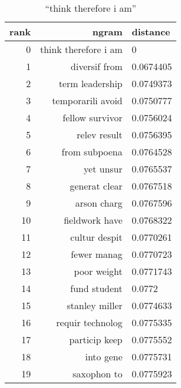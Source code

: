 \begin{table}[ht]
    \begin{subtable}[t]{.45\textwidth}
        \centering
        \begin{tabularx}{\textwidth}{r R l}
            \toprule
            rank & ngram & distance\\
            \midrule
            \num{0} & think therefore i am & \num{0}\\
            \num{1} & diversif from & \num{0.0674405}\\
            \num{2} & term leadership & \num{0.0749373}\\
            \num{3} & temporarili avoid & \num{0.0750777}\\
            \num{4} & fellow survivor & \num{0.0756024}\\
            \midrule
            \num{5} & relev result & \num{0.0756395}\\
            \num{6} & from subpoena & \num{0.0764528}\\
            \num{7} & yet unsur & \num{0.0765537}\\
            \num{8} & generat clear & \num{0.0767518}\\
            \num{9} & arson charg & \num{0.0767596}\\
            \num{10} & fieldwork have & \num{0.0768322}\\
            \num{11} & cultur despit & \num{0.0770261}\\
            \num{12} & fewer manag & \num{0.0770723}\\
            \num{13} & poor weight & \num{0.0771743}\\
            \num{14} & fund student & \num{0.0772}\\
            \num{15} & stanley miller & \num{0.0774633}\\
            \num{16} & requir technolog & \num{0.0775335}\\
            \num{17} & particip keep & \num{0.0775552}\\
            \num{18} & into gene & \num{0.0775731}\\
            \num{19} & saxophon to & \num{0.0775923}\\
            \bottomrule
        \end{tabularx}
        \caption{\enquote{think therefore i am}}
        \label{tab:ranking_chance_1}
    \end{subtable}
    \hfill
    \begin{subtable}[t]{.45\textwidth}

\end{subtable}
\end{table}
